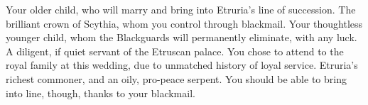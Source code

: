 \documentclass[char]{Kos}
\begin{document}
\begin{contacts}
\contact{\cGroom{}} Your older child, who will marry \cBride{} and bring \cBride{} into Etruria's line of succession.
\contact{\cBride{}} The brilliant crown \cBride{\prince} of Scythia, whom you control through blackmail.
\contact{\cPoet{}} Your thoughtless younger child, whom the Blackguards will permanently eliminate, with any luck.
\contact{\cAssassin{}} A diligent, if quiet servant of the Etruscan palace. You chose \cAssassin{\them} to attend to the royal family at this wedding, due to \cAssassin{\their} unmatched history of loyal service.
\contact{\cMerchant{}} Etruria's richest commoner, and an oily, pro-peace serpent. You should be able to bring \cMerchant{\them} into line, though, thanks to your blackmail.
\end{contacts} 
\end{document}
